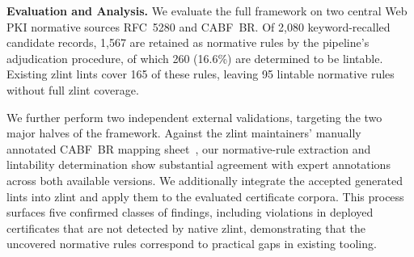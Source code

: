 
\noindent \textbf{Evaluation and Analysis.}
We evaluate the full framework on two central Web PKI normative sources RFC~5280 and CABF~BR.
Of 2,080 keyword-recalled candidate records, 1,567 are retained as normative rules by the pipeline's adjudication procedure, of which 260 (16.6\%) are determined to be lintable.
Existing zlint lints cover 165 of these rules, leaving 95 lintable normative rules without full zlint coverage. 

We further perform two independent external validations, targeting the two major halves of the framework.
Against the zlint maintainers' manually annotated CABF~BR mapping sheet~\cite{zlint-mapping-sheet}, our normative-rule extraction and lintability determination show substantial agreement with expert annotations across both available versions.
We additionally integrate the accepted generated lints into zlint and apply them to the evaluated certificate corpora.
This process surfaces five confirmed classes of findings, including violations in deployed certificates that are not detected by native zlint, demonstrating that the uncovered normative rules correspond to practical gaps in existing tooling.

